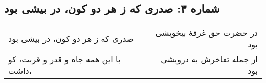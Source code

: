 \begin{center}
\section*{شماره ۳: صدری که ز هر دو کون، در بیشی بود}
\label{sec:003}
\begin{longtable}{l p{0.5cm} r}
صدری که ز هر دو کون، در بیشی بود
&&
در حضرت حق غرقهٔ بیخویشی بود
\\
با این همه جاه و قدر و قربت، کو داشت،
&&
از جمله تفاخرش به درویشی بود
\\
\end{longtable}
\end{center}
